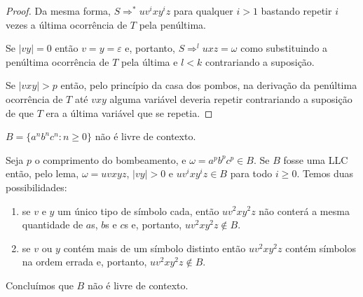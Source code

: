 \begin{proof}
Da mesma forma, $S \Rightarrow^* uv^ixy^iz$ para qualquer $i > 1$ bastando repetir $i$ vezes a última ocorrência de $T$ pela penúltima.

 \begin{center}
  \end{center}

Se $|vy| = 0$ então $v = y = \varepsilon$ e, portanto, $S \Rightarrow^l uxz = \omega$ como substituindo a penúltima ocorrência de $T$ pela última e $l < k$ contrariando a suposição.

Se $|vxy| > p$ então, pelo princípio da casa dos pombos, na derivação da penúltima ocorrência de $T$ até $vxy$ alguma variável deveria repetir contrariando a suposição de que $T$ era a última variável que se repetia.
\end{proof}


\begin{example}
  $B = \{a^nb^nc^n : n \geq 0\}$ não é livre de contexto.

  Seja $p$ o comprimento do bombeamento, e $\omega = a^pb^pc^p \in B$.
  Se $B$ fosse uma LLC então, pelo lema, $\omega = uvxyz$, $|vy| > 0$ e $uv^ixy^iz \in B$ para todo $i \geq 0$.
  Temos duas possibilidades:
  \begin{enumerate}
  \item se $v$ e $y$ um único tipo de símbolo cada, então $uv^2xy^2z$ não conterá a mesma quantidade de $a$s, $b$s e $c$s e, portanto, $uv^2xy^2z \notin B$.
  \item se $v$ ou $y$ contém mais de um símbolo distinto então $uv^2xy^2z$ contém símbolos na ordem errada e, portanto, $uv^2xy^2z \notin B$.
  \end{enumerate}
  Concluímos que $B$ não é livre de contexto.
\end{example}

